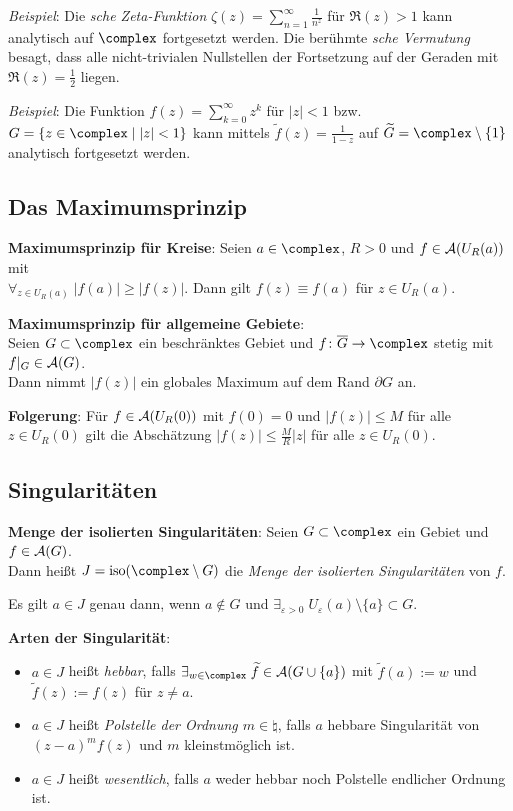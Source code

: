 \linie

\emph{Beispiel}:
Die \emph{sche Zeta-Funktion}
$\zeta(z) = \sum_{n=1}^\infty \frac{1}{n^z}$ für $\Re(z) > 1$ kann
analytisch auf $\complex$ fortgesetzt werden.
Die berühmte \emph{sche Vermutung} besagt, dass alle
nicht-trivialen Nullstellen
der Fortsetzung auf der Geraden mit $\Re(z) = \frac{1}{2}$ liegen.

\emph{Beispiel}:
Die Funktion $f(z) = \sum_{k=0}^\infty z^k$ für $|z| < 1$ bzw.
$G = \{z \in \complex \;|\; |z| < 1\}$ kann mittels
$\widetilde{f}(z) = \frac{1}{1 - z}$ auf
$\widetilde{G} = \complex \setminus \{1\}$ analytisch fortgesetzt werden.

\subsection{%
    Das Maximumsprinzip%
}

\textbf{Maximumsprinzip für Kreise}:
Seien $a \in \complex$, $R > 0$ und $f \in \mathcal{A}(U_R(a))$ mit\\
$\forall_{z \in U_R(a)}\; |f(a)| \ge |f(z)|$.
Dann gilt $f(z) \equiv f(a)$ für $z \in U_R(a)$.

\textbf{Maximumsprinzip für allgemeine Gebiete}:\\
Seien $G \subset \complex$ ein beschränktes Gebiet und
$f\colon \overline{G} \rightarrow \complex$ stetig mit $f|_G \in \mathcal{A}(G)$.\\
Dann nimmt $|f(z)|$ ein globales Maximum auf dem Rand $\partial G$ an.

\textbf{Folgerung}:
Für $f \in \mathcal{A}(U_R(0))$ mit $f(0) = 0$ und $|f(z)| \le M$ für alle
$z \in U_R(0)$ gilt die Abschätzung $|f(z)| \le \frac{M}{R} |z|$
für alle $z \in U_R(0)$.

\subsection{%
    Singularitäten%
}

\textbf{Menge der isolierten Singularitäten}:
Seien $G \subset \complex$ ein Gebiet und $f \in \mathcal{A}(G)$.\\
Dann heißt $J = \iso(\complex \setminus G)$ die
\emph{Menge der isolierten Singularitäten} von $f$.

Es gilt $a \in J$ genau dann, wenn
$a \notin G$ und
$\exists_{\varepsilon > 0}\; U_\varepsilon(a) \setminus \{a\} \subset G$.

\textbf{Arten der Singularität}:
\begin{itemize}
    \item
    $a \in J$ heißt \emph{hebbar}, falls
    $\exists_{w \in \complex}\; \widetilde{f} \in \A(G \cup \{a\})$ mit
    $\widetilde{f}(a) := w$ und $\widetilde{f}(z) := f(z)$ für $z \not= a$.
    
    \item
    $a \in J$ heißt \emph{Polstelle der Ordnung $m \in \natural$}, falls
    $a$ hebbare Singularität von $(z - a)^m f(z)$ und $m$ kleinstmöglich ist.
    
    \item
    $a \in J$ heißt \emph{wesentlich}, falls $a$ weder hebbar noch
    Polstelle endlicher Ordnung ist.
\end{itemize}

